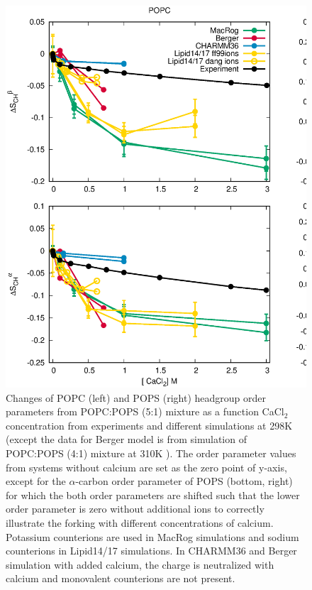 \documentclass[aps,prl,superscriptaddress,twocolumn]{revtex4}
\begin{document}
\begin{figure}[ht]
  \centering
  \includegraphics[width=18cm]{../Figs/CHANGESwithCaClPS.eps}
  \caption{\label{changesWITHCaClPS}
    Changes of POPC (left) and POPS (right) headgroup order parameters from POPC:POPS (5:1) mixture
    as a function CaCl$_2$ concentration from experiments \cite{roux90} and different simulations
    at 298K (except the data for Berger model is from simulation of POPC:POPS (4:1) mixture at 310K \cite{ollila07a,melcrova16}). 
    The order parameter values from systems without calcium are set as the zero point of y-axis,
    except for the $\alpha$-carbon order parameter of POPS (bottom, right) for which the both order parameters are shifted
    such that the lower order parameter is zero without additional ions to correctly illustrate
    the forking with different concentrations of calcium.
    Potassium counterions are used in MacRog simulations and sodium counterions in Lipid14/17 simulations.
    In CHARMM36 and Berger simulation with added calcium, the charge is neutralized with calcium and monovalent counterions are not present.
  }
\end{figure}
\end{document}
